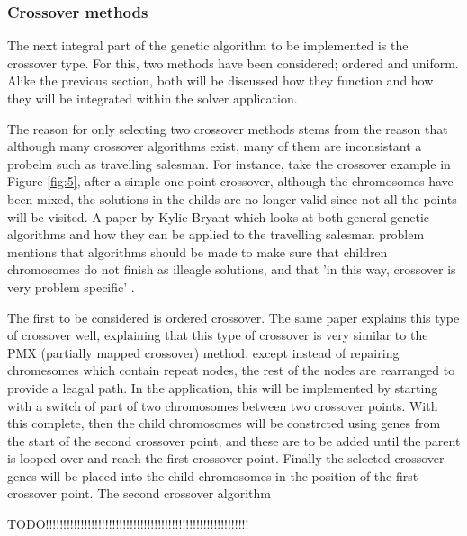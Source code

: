 \documentclass[article]{IEEEtran}
\begin{document}
\subsubsection{Crossover methods}
The next integral part of the genetic algorithm to be implemented is the crossover type. For this, two methods have been considered; ordered and uniform. Alike the previous section, both will be discussed how they function and how they will be integrated within the solver application. \par
The reason for only selecting two crossover methods stems from the reason that although many crossover algorithms exist, many of them are inconsistant a probelm such as travelling salesman. For instance, take the crossover example in Figure \ref{fig:5}, after a simple one-point crossover, although the chromosomes have been mixed, the solutions in the childs are no longer valid since not all the points will be visited. A paper by Kylie Bryant which looks at both general genetic algorithms and how they can be applied to the travelling salesman problem mentions that algorithms should be made to make sure that children chromosomes do not finish as illeagle solutions, and that 'in this way, crossover is very problem specific' \cite{7}. \par
The first to be considered is ordered crossover. The same paper explains this type of crossover well, explaining that this type of crossover is very similar to the PMX (partially mapped crossover) method, except instead of repairing chromesomes which contain repeat nodes, the rest of the nodes are rearranged to provide a leagal path. In the application, this will be implemented by starting with a switch of part of two chromosomes between two crossover points. With this complete, then the child chromosomes will be constrcted using genes from the start of the second crossover point, and these are to be  added until the parent is looped over and reach the first crossover point. Finally the selected crossover genes will be placed into the child chromosomes in the position of the first crossover point.
The second crossover algorithm 

TODO!!!!!!!!!!!!!!!!!!!!!!!!!!!!!!!!!!!!!!!!!!!!!!!!!!!!!!!!!!
\end{document}
